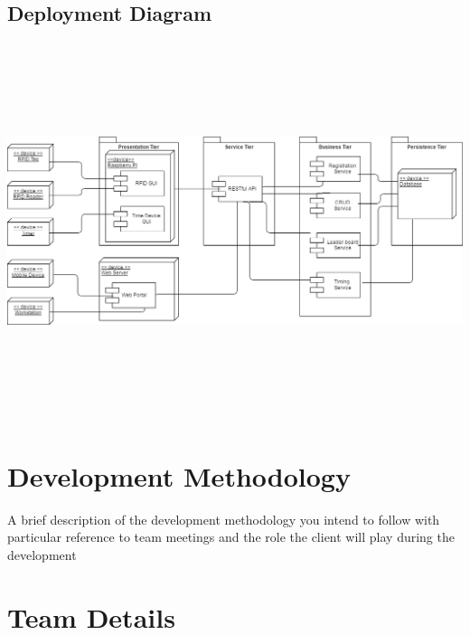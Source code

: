 \documentclass{article}
\begin{document}
\subsection{Deployment Diagram} 
\includegraphics[width=18cm,height=11cm,keepaspectratio]{ETA-Deployment.png}

\section{Development Methodology}
A brief description of the development methodology you intend to follow with particular
reference to team meetings and the role the client will play during the development

\section{Team Details}
\end{document}
